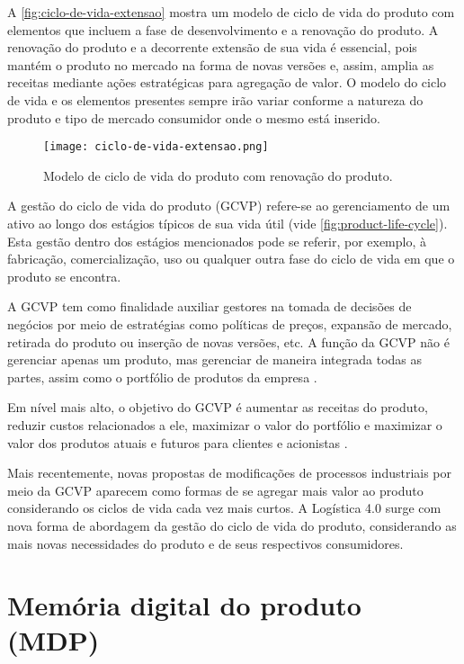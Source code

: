 A \autoref{fig:ciclo-de-vida-extensao} mostra um modelo de ciclo de vida do produto com elementos que incluem a fase de desenvolvimento e a renovação do produto. A renovação do produto e a decorrente extensão de sua vida é essencial, pois mantém o produto no mercado na forma de novas versões e, assim, amplia as receitas mediante ações estratégicas para agregação de valor. O modelo do ciclo de vida e os elementos presentes sempre irão variar conforme a natureza do produto e tipo de mercado consumidor onde o mesmo está inserido.

\begin{figure}[htb]
	\centering
	\texttt{[image: ciclo-de-vida-extensao.png]}
	\caption{Modelo de ciclo de vida do produto com renovação do produto.}
	\label{fig:ciclo-de-vida-extensao}
\end{figure}

A gestão do ciclo de vida do produto (GCVP) refere-se ao gerenciamento de um ativo ao longo dos estágios típicos de sua vida útil (vide \autoref{fig:product-life-cycle}). Esta gestão dentro dos estágios mencionados pode se referir, por exemplo, à fabricação, comercialização, uso ou qualquer outra fase do ciclo de vida em que o produto se encontra.

A GCVP tem como finalidade auxiliar gestores na tomada de decisões de negócios por meio de estratégias como políticas de preços, expansão de mercado, retirada do produto ou inserção de novas versões, etc. A função da GCVP não é gerenciar apenas um produto, mas gerenciar de maneira integrada todas as partes, assim como o portfólio de produtos da empresa \cite{stark2015lifecycle}.

Em nível mais alto, o objetivo do GCVP é aumentar as receitas do produto, reduzir custos relacionados a ele, maximizar o valor do portfólio e maximizar o valor dos produtos atuais e futuros para clientes e acionistas \cite{stark2015lifecycle}.

Mais recentemente, novas propostas de modificações de processos industriais por meio da GCVP aparecem como formas de se agregar mais valor ao produto considerando os ciclos de vida cada vez mais curtos. A Logística 4.0 surge com nova forma de abordagem da gestão do ciclo de vida do produto, considerando as mais novas necessidades do produto e de seus respectivos consumidores.

\section{Memória digital do produto (MDP)}
\label{sec:mdp}

